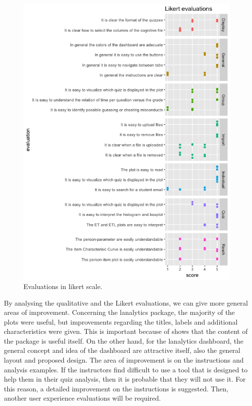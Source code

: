 \begin{figure}[ht!]
\centering
\includegraphics[width=\linewidth]{img/likert.png}
\caption{Evaluations in likert scale.}
\label{img:likert}
\end{figure}

By analysing the qualitative and the Likert evaluations, we can give more general areas of improvement. Concerning the lanalytics package, the majority of the plots were useful, but improvements regarding the titles, labels and additional characteristics were given. This is important because of shows that the content of the package is useful itself. On the other hand, for the lanalytics dashboard, the general concept and idea of the dashboard are attractive itself, also the general layout and proposed design. The area of improvement is on the instructions and analysis examples. If the instructors find difficult to use a tool that is designed to help them in their quiz analysis, then it is probable that they will not use it. For this reason, a detailed improvement on the instructions is suggested. Then, another user experience evaluations will be required.


